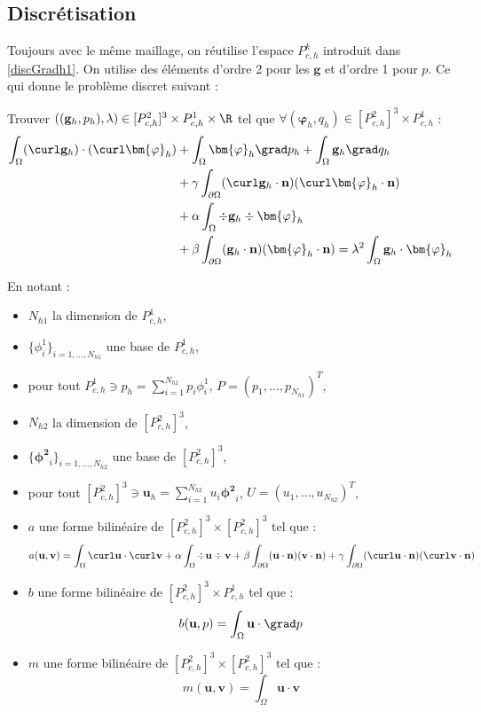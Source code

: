 \subsection{Discrétisation}
Toujours avec le même maillage, on réutilise l'espace $P^k_{c,h}$ introduit dans \ref{discGradh1}. On utilise des éléments d'ordre 2 pour les $\mathbf{g}$ et d'ordre 1 pour $p$. Ce qui donne le problème discret suivant :
\begin{pb}\label{disceigenh1}
Trouver $((\mathbf{g}_h,p_h),\lambda)\in [P^2_{c,h}]^3\times P^1_{c,h} \times \R$ tel que $\forall (\bm{\varphi}_h,q_h)\in [P^2_{c,h}]^3\times P^1_{c,h}$ :
\begin{align*}
\int_\Omega (\curl\mathbf{g}_h)\cdot(\curl\bm{\varphi}_h) &+ \int_\Omega\bm{\varphi}_h\grad p_h + \int_\Omega \mathbf{g}_h\grad q_h \\
&+ \gamma\int_{\partial\Omega}(\curl\mathbf{g}_h\cdot\mathbf{n})(\curl\bm{\varphi}_h\cdot\mathbf{n})\\
& + \alpha\int_\Omega \div\mathbf{g}_h\div\bm{\varphi}_h \\
&+ \beta\int_{\partial\Omega}(\mathbf{g}_h\cdot\mathbf{n})(\bm{\varphi}_h\cdot\mathbf{n})  = \lambda^2\int_\Omega \mathbf{g}_h\cdot\bm{\varphi}_h
\end{align*} \end{pb}

En notant :
\begin{itemize}
\item $N_{h1}$ la dimension de $P^1_{c,h}$,
\item $\{\phi^1_i\}_{i=1,\dots,N_{h1}}$ une base de $P^1_{c,h}$,
\item pour tout $P^1_{c,h}\ni p_h=\sum_{i=1}^{N_{h1}} p_i\phi^1_i$, $P=(p_1,\dots,p_{N_{h1}})^T$,
\item $N_{h2}$ la dimension de $[P^2_{c,h}]^3$,
\item $\{\bm{\phi^2}_i\}_{i=1,\dots,N_{h2}}$ une base de $[P^2_{c,h}]^3$,
\item pour tout $[P^2_{c,h}]^3\ni \mathbf{u}_h=\sum_{i=1}^{N_{h2}} u_i\bm{\phi^2}_i$, $U=(u_1,\dots,u_{N_{h2}})^T$,
\item $a$ une forme bilinéaire de $[P^2_{c,h}]^3\times [P^2_{c,h}]^3$ tel que : 
\[ a(\mathbf{u},\mathbf{v})=\int_\Omega \curl \mathbf{u}\cdot \curl \mathbf{v} + \alpha\int_\Omega \div\mathbf{u}\div\mathbf{v} + \beta\int_{\partial\Omega}(\mathbf{u}\cdot\mathbf{n})(\mathbf{v}\cdot\mathbf{n}) + \gamma\int_{\partial\Omega}(\curl\mathbf{u}\cdot\mathbf{n})(\curl\mathbf{v}\cdot\mathbf{n}) \]
\item $b$ une forme bilinéaire de $[P^2_{c,h}]^3\times P^1_{c,h}$ tel que : \[ b(\mathbf{u},p) = \int_\Omega \mathbf{u}\cdot\grad p \]
\item $m$ une forme bilinéaire de $[P^2_{c,h}]^3\times [P^2_{c,h}]^3$ tel que : \[ m(\mathbf{u},\mathbf{v})=\int_\Omega \mathbf{u}\cdot\mathbf{v} \]
\end{itemize}

